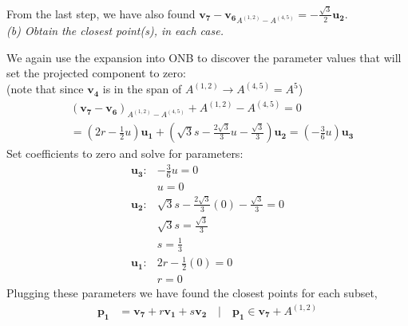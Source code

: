 \documentclass[12pt]{article}
\begin{document}
\begin{enumerate}
\begin{enumerate}
                    From the last step, we have also found \(\mathbf{v_7-v_6}_{A^{(1,2)} - A^{(4,5)}} = -\tfrac{\sqrt{3}}{2}\mathbf{u_2}\). \\

                    \emph{(b) Obtain the closest point(s), in each case.}

                    We again use the expansion into ONB to discover the parameter values that will set the projected component to zero:
                    \\ (note that since $\mathbf{v_4}$ is in the span of $A^{(1,2)} \rightarrow{} A^{(4,5)} = A^5$)
                    \begin{align*}
                         & (\mathbf{v_7 - v_6})_{A^{(1,2)} - A^{(4,5)}} + A^{(1,2)} - A^{(4,5)} = 0 \\
                         & = (2r - \tfrac{1}{2}u) \mathbf{u_1}
                        + (\sqrt{3}s - \tfrac{2\sqrt{3}}{3}u - \tfrac{\sqrt{3}}{3}) \mathbf{u_2}
                        = (-\tfrac{3}{6}u) \mathbf{u_3}
                    \end{align*}
                    Set coefficients to zero and solve for parameters:
                    \begin{align*}
                        \mathbf{u_3}: & -\tfrac{3}{6}u = 0                                            \\
                                      & u = 0                                                         \\
                        \mathbf{u_2}: & \sqrt{3}s - \tfrac{2\sqrt{3}}{3}(0) - \tfrac{\sqrt{3}}{3} = 0 \\
                                      & \sqrt{3}s = \tfrac{\sqrt{3}}{3}                               \\
                                      & s = \tfrac{1}{3}                                              \\
                        \mathbf{u_1}: & 2r - \tfrac{1}{2}(0)=0                                        \\
                                      & r= 0
                    \end{align*}
                    Plugging these parameters we have found the closest points for each subset,
                    \begin{align*}
                        \mathbf{p_1} & = \mathbf{v_7} + r\mathbf{v_1} + s\mathbf{v_2} \quad{} | \quad{} \mathbf{p_1} \in{} \mathbf{v_7} + A^{(1,2)} \\

\end{align*}
\end{enumerate}
\end{enumerate}
\end{document}
